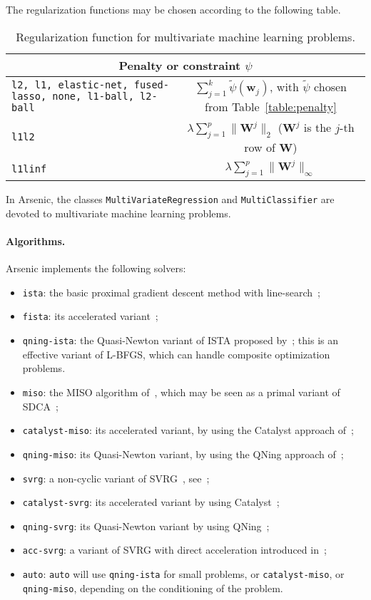 \documentclass{article}
\def\w{{\mathbf{w}}}
\def\W{{\mathbf{W}}}
\begin{document}
The regularization functions may be chosen according to the following table.
\begin{table}[h!]
   \centering
   \begin{tabular}{|p{5cm}|c|}
      \hline
      \multicolumn{2}{|c|}{Penalty or constraint $\psi$}     \\  
      \hline
      \texttt{l2, l1, elastic-net, fused-lasso, none, l1-ball, l2-ball} & 
      $\sum_{j=1}^k \tilde{\psi}(\w_j)$, with $\tilde{\psi}$ chosen from Table~\ref{table:penalty} \\
      \hline
      \texttt{l1l2} & $\lambda \sum_{j=1}^p \| \W^j\|_2$ ($\W^j$ is the $j$-th row of $\W$) \\ 
      \hline
      \texttt{l1linf} & $\lambda \sum_{j=1}^p \| \W^j\|_\infty$  \\ 
      \hline
   \end{tabular}
   \caption{Regularization function for multivariate machine learning problems.}
\end{table}

In Arsenic, the classes \texttt{MultiVariateRegression} and \texttt{MultiClassifier} are devoted to multivariate machine learning problems.

\paragraph{Algorithms.}
Arsenic implements the following solvers:
\begin{itemize}
   \item \texttt{ista}: the basic proximal gradient descent method with line-search~\citep[see][]{fista};
   \item \texttt{fista}: its accelerated variant~\citep{fista};
   \item \texttt{qning-ista}: the Quasi-Newton variant of ISTA proposed by~\citet{lin2019inexact}; this is an effective variant of L-BFGS, which can handle composite optimization problems.
   \item \texttt{miso}: the MISO algorithm of~\citet{miso}, which may be seen as a primal variant of SDCA~\citep{sdca};
   \item \texttt{catalyst-miso}: its accelerated variant, by using the Catalyst approach of~\citet{lin2018catalyst};
   \item \texttt{qning-miso}: its Quasi-Newton variant, by using the QNing approach of~\citet{lin2019inexact};
   \item \texttt{svrg}: a non-cyclic variant of SVRG~\citep{proxsvrg}, see~\citep{kulunchakov2019estimate};
   \item \texttt{catalyst-svrg}: its accelerated variant by using Catalyst~\citep{lin2018catalyst};
   \item \texttt{qning-svrg}: its Quasi-Newton variant by using QNing~\citep{lin2019inexact};
   \item \texttt{acc-svrg}: a variant of SVRG with direct acceleration introduced in~\citep{kulunchakov2019estimate};
   \item \texttt{auto}: \texttt{auto} will use \texttt{qning-ista} for small problems, or \texttt{catalyst-miso}, or \texttt{qning-miso}, depending on the conditioning of the problem.
\end{itemize}
\end{document}
